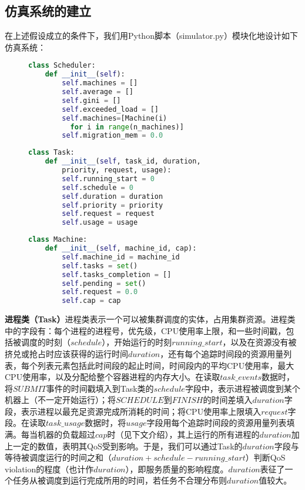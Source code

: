 \subsection{仿真系统的建立}
在上述假设成立的条件下，我们用Python脚本（simulator.py）模块化地设计如下仿真系统：

\begin{figure}
\centering
\begin{minipage}[c]{0.55\textwidth}
\begin{lstlisting}[language=python]
class Scheduler:
    def __init__(self):
        self.machines = []
        self.average = []
        self.gini = []
        self.exceeded_load = []
        self.machines=[Machine(i) 
          for i in range(n_machines)]
        self.migration_mem = 0.0
\end{lstlisting}
\end{minipage}
\begin{minipage}[c]{0.55\textwidth}
\begin{lstlisting}[language=python]
class Task:
    def __init__(self, task_id, duration,
        priority, request, usage):
        self.running_start = 0
        self.schedule = 0
        self.duration = duration
        self.priority = priority
        self.request = request
        self.usage = usage
\end{lstlisting}
\end{minipage}
\begin{minipage}[c]{0.55\textwidth}
\begin{lstlisting}[language=python]
class Machine:
    def __init__(self, machine_id, cap):
        self.machine_id = machine_id
        self.tasks = set()
        self.tasks_completion = []
        self.pending = set()
        self.request = 0.0
        self.cap = cap
\end{lstlisting}
\end{minipage}
\end{figure}

\noindent\textbf{进程类（Task）}\quad \label{chap:task}进程类表示一个可以被集群调度的实体，占用集群资源。进程类中的字段有：每个进程的进程号，优先级，CPU使用率上限，和一些时间戳，包括被调度的时刻（$schedule$），开始运行的时刻$running\_start$，以及在资源没有被挤兑或抢占时应该获得的运行时间$duration$，还有每个追踪时间段的资源用量列表，每个列表元素包括此时间段的起止时间，时间段内的平均CPU使用率，最大CPU使用率，以及分配给整个容器进程的内存大小。在读取$task\_events$数据时，将$SUBMIT$事件的时间戳填入到Task类的$schedule$字段中，表示进程被调度到某个机器上（不一定开始运行）；将$SCHEDULE$到$FINISH$的时间差填入$duration$字段，表示进程以最充足资源完成所消耗的时间；将CPU使用率上限填入$request$字段。在读取$task\_usage$数据时，将$usage$字段用每个追踪时间段的资源用量列表填满。每当机器的负载超过$cap$时（见下文介绍），其上运行的所有进程的$duration$加上一定的数值，表明其QoS受到影响。于是，我们可以通过Task的$duration$字段与等待被调度运行的时间之和（$duration + schedule - running\_start$）判断QoS violation的程度（也计作$duration$），即服务质量的影响程度。$duration$表征了一个任务从被调度到运行完成所用的时间，若任务不合理分布则$duration$值较大。

